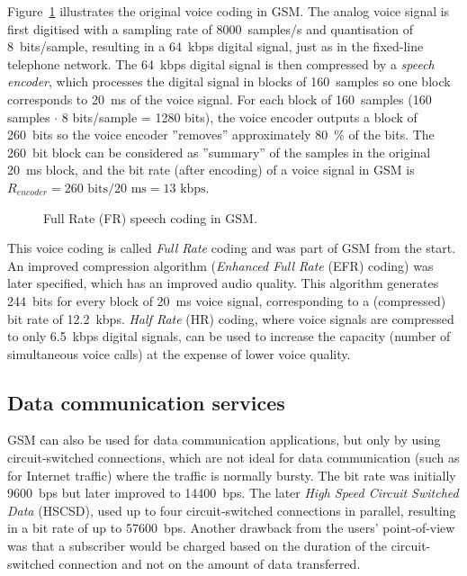 Figure~\ref{fig:gsm_voicecoding} illustrates the original voice coding in GSM. The analog voice signal is first digitised with a sampling rate of 8000~samples/s and quantisation of 8~bits/sample, resulting in a 64~kbps digital signal, just as in the fixed-line telephone network. The 64~kbps digital signal is then compressed by a \emph{speech encoder}, which processes the digital signal in blocks of 160~samples so one block corresponds to 20~ms of the voice signal. For each block of 160~samples (160 samples $\cdot$ 8 bits/sample = 1280 bits), the voice encoder outputs a block of 260~bits so the voice encoder ''removes'' approximately 80~\% of the bits. The 260~bit block can be considered as ''summary'' of the samples in the original 20~ms block, and the bit rate (after encoding) of a voice signal in GSM is $R_{encoder}={260\textrm{ bits}}/{20\textrm{ ms}}=13\textrm{ kbps}$.

\begin{figure}[htbp]
\centering
{}
\caption{\label{fig:gsm_voicecoding}Full Rate (FR) speech coding in GSM.}
\end{figure}

This voice coding is called \emph{Full Rate} coding and was part of GSM from the start. An improved compression algorithm (\emph{Enhanced Full Rate} (EFR) coding) was later specified, which has an improved audio quality. This algorithm generates 244~bits for every block of 20~ms voice signal, corresponding to a (compressed) bit rate of 12.2~kbps. \emph{Half Rate} (HR) coding, where voice signals are compressed to only 6.5~kbps digital signals, can be used to increase the capacity (number of simultaneous voice calls) at the expense of lower voice quality.

\subsection{Data communication services}
GSM can also be used for data communication applications, but only by using circuit-switched connections, which are not ideal for data communication (such as for Internet traffic) where the traffic is normally bursty. The bit rate was initially 9600~bps but later improved to 14400~bps. The later \emph{High Speed Circuit Switched Data} (HSCSD), used up to four circuit-switched connections in parallel, resulting in a bit rate of up to 57600~bps. Another drawback from the users' point-of-view was that a subscriber would be charged based on the duration of the circuit-switched connection and not on the amount of data transferred.


